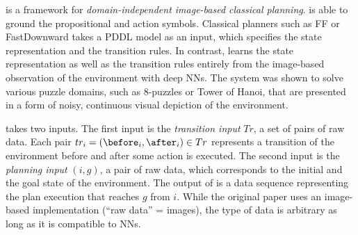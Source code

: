 \textbf{\latentplanner} \cite{Asai2018} is a framework for
\emph{domain-independent image-based classical planning}.
\latentplanner is able to ground
the propositional and action symbols.
% 
Classical planners such as FF \cite{Hoffmann01} or
FastDownward \cite{Helmert04} takes a PDDL model as an input, which
specifies the state representation and the transition rules.
In contrast, \latentplanner learns the state representation as well as the transition rules
entirely from the image-based observation of the environment with deep NNs.
The system was shown to solve various puzzle domains, such as 8-puzzles or Tower of Hanoi,
that are presented in a form of noisy, continuous visual depiction of the environment.


\latentplanner takes two inputs.
The first input is the \emph{transition input} $Tr$, a set of pairs of raw data.
Each pair $tr_i=(\before_i, \after_i) \in Tr$ represents a transition of the environment before and after some action is executed.
The second input is the \emph{planning input} $(i, g)$, a pair of raw data, which corresponds to the initial and the goal state of the environment.
The output of \latentplanner is a data sequence representing the plan execution that reaches $g$ from $i$.
While the original paper uses an image-based implementation (``raw data'' = images),
the type of data is arbitrary as long as it is compatible to NNs.


